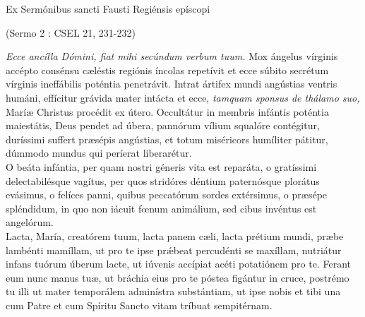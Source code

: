\documentclass[options]{article}
\begin{document}
	Ex Sermónibus sancti Fausti Regiénsis epíscopi
	\begin{flushright}
			
		(Sermo 2 : CSEL 21, 231-232)
	\end{flushright}
\emph{Ecce ancílla Dómini, fiat mihi secúndum verbum tuum.}	
 Mox ángelus vírginis accépto consénsu cæléstis regiónis íncolas repetívit et ecce súbito secrétum vírginis ineffábilis poténtia penetrávit. Intrat ártifex mundi angústias ventris humáni, effícitur grávida mater intácta et ecce, 
 \emph{tamquam sponsus de thálamo suo,}
 Maríæ Christus procédit ex útero. Occultátur in membris infántis poténtia maiestátis, Deus pendet ad úbera, pannórum vílium squalóre contégitur, duríssimi suffert præsépis angústias, et totum miséricors humíliter pátitur, dúmmodo mundus qui períerat liberarétur.\\
	
	O beáta infántia, per quam nostri géneris vita est reparáta, o gratíssimi delectabilésque vagítus, per quos stridóres déntium paternósque plorátus evásimus, o felíces panni, quibus peccatórum sordes extérsimus, o præsépe spléndidum, in quo non iácuit fœnum animálium, sed cibus invéntus est angelórum.\\
	
	Lacta, María, creatórem tuum, lacta panem cæli, lacta prétium mundi, præbe lambénti mamíllam, ut pro te ipse pr\'{æ}beat percudénti se maxíllam, nutriátur infans tuórum úberum lacte, ut iúvenis accípiat acéti potatiónem pro te. Ferant eum nunc manus tuæ, ut bráchia eius pro te póstea figántur in cruce, postrémo tu illi ut mater temporálem adminístra substántiam, ut ipse nobis et tibi una cum Patre et cum Spíritu Sancto vitam tríbuat sempitérnam.
\end{document}
